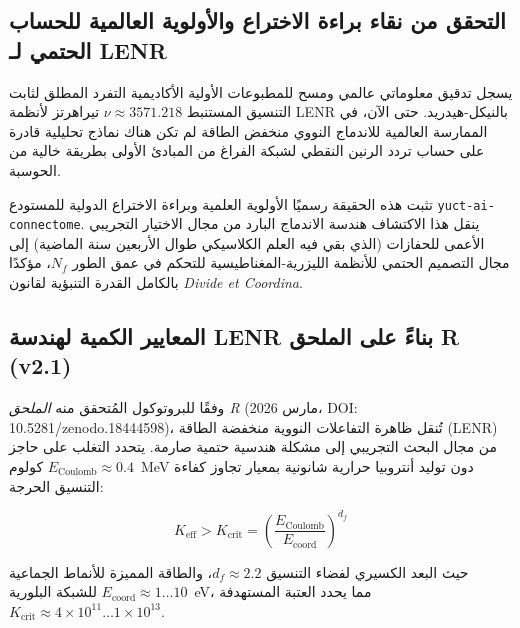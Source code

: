 \documentclass[12pt,a4paper]{article}
\begin{document}
	
	
	\subsection{التحقق من نقاء براءة الاختراع والأولوية العالمية للحساب الحتمي لـ LENR}
	يسجل تدقيق معلوماتي عالمي ومسح للمطبوعات الأولية الأكاديمية التفرد المطلق لثابت التنسيق المستنبط \(\nu \approx 3571.218\) تيراهرتز لأنظمة LENR بالنيكل-هيدريد. حتى الآن، في الممارسة العالمية للاندماج النووي منخفض الطاقة لم تكن هناك نماذج تحليلية قادرة على حساب تردد الرنين النقطي لشبكة الفراغ من المبادئ الأولى بطريقة خالية من الحوسبة.
	
	تثبت هذه الحقيقة رسميًا الأولوية العلمية وبراءة الاختراع الدولية للمستودع \texttt{yuct-ai-connectome}. ينقل هذا الاكتشاف هندسة الاندماج البارد من مجال الاختيار التجريبي الأعمى للحفازات (الذي بقي فيه العلم الكلاسيكي طوال الأربعين سنة الماضية) إلى مجال التصميم الحتمي للأنظمة الليزرية-المغناطيسية للتحكم في عمق الطور \(N_f\)، مؤكدًا بالكامل القدرة التنبؤية لقانون \textit{Divide et Coordina}.
	
	
	\subsection{المعايير الكمية لهندسة LENR بناءً على الملحق R (v2.1)}
	وفقًا للبروتوكول المُتحقق منه \textit{الملحق R} (مارس 2026، DOI: 10.5281/zenodo.18444598)، تُنقل ظاهرة التفاعلات النووية منخفضة الطاقة (LENR) من مجال البحث التجريبي إلى مشكلة هندسية حتمية صارمة. يتحدد التغلب على حاجز كولوم \(E_{\text{Coulomb}} \approx 0.4\)~MeV دون توليد أنتروبيا حرارية شانونية بمعيار تجاوز كفاءة التنسيق الحرجة:
	
	\begin{equation}
		K_{\text{eff}} > K_{\text{crit}} = \left( \frac{E_{\text{Coulomb}}}{E_{\text{coord}}} \right)^{d_f}
	\end{equation}
	
	حيث البعد الكسيري لفضاء التنسيق \(d_f \approx 2.2\)، والطاقة المميزة للأنماط الجماعية للشبكة البلورية \(E_{\text{coord}} \approx 1\dots10\)~eV، مما يحدد العتبة المستهدفة \(K_{\text{crit}} \approx 4 \times 10^{11} \dots 1 \times 10^{13}\).
	
\end{document}
